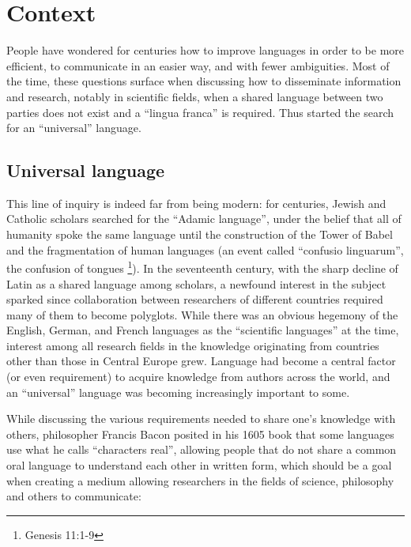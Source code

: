 \chapter{Context}
\label{chap:context}

\vspace{0.5cm}

People have wondered for centuries how to improve languages in order to be more efficient, to communicate in an easier way, and with fewer ambiguities.
Most of the time, these questions surface when discussing how to disseminate information and research, notably in scientific fields, when a shared language
between two parties does not exist and a ``lingua franca'' is required. Thus started the search for an ``universal'' language.

\section{Universal language}

This line of inquiry is indeed far from being modern: for centuries, Jewish and Catholic scholars searched for the ``Adamic language'', under the belief that
all of humanity spoke the same language until the construction of the Tower of Babel and the fragmentation of human languages (an event called ``confusio linguarum'',
the confusion of tongues \footnote{Genesis 11:1-9}). In the seventeenth century, with the sharp decline of Latin as a shared language among scholars, a newfound interest in
the subject sparked since collaboration between researchers of different countries required many of them to become polyglots. While there was an obvious hegemony of the English,
German, and French languages as the ``scientific languages'' at the time, interest among all research fields in the knowledge originating from countries other than those in Central Europe grew.
Language had become a central factor (or even requirement) to acquire knowledge from authors across the world, and an ``universal'' language was becoming increasingly important to some.\newline

While discussing the various requirements needed to share one's knowledge with others, philosopher Francis Bacon posited in his 1605 book that some languages use what
he calls ``characters real'', allowing people that do not share a common oral language to understand each other in written form, which should be a goal when creating a
medium allowing researchers in the fields of science, philosophy and others to communicate:

